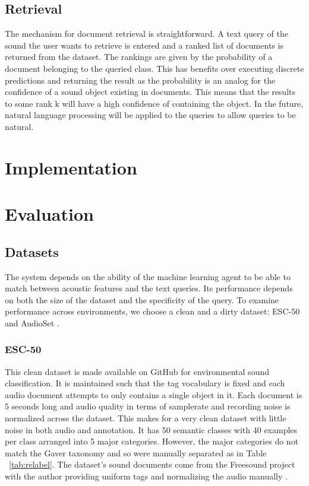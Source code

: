 \subsection{Retrieval}
The mechanism for document retrieval is straightforward. A text query of the sound the user wants to retrieve is entered and a ranked list of documents is returned from the dataset. The rankings are given by the probability of a document belonging to the queried class. This has benefits over executing discrete predictions and returning the result as the probability is an analog for the confidence of a sound object existing in documents. This means that the results to some rank k will have a high confidence of containing the object. In the future, natural language processing will be applied to the queries to allow queries to be natural.

\section{Implementation}

\section{Evaluation}

\subsection{Datasets}
The system depends on the ability of the machine learning agent to be able to match between acoustic features and the text queries. Its performance depends on both the size of the dataset and the specificity of the query. To examine performance across environments, we choose a clean and a dirty dataset: ESC-50 \cite{Piczak2015} and AudioSet \cite{Gemmeke2017}.

\subsubsection{ESC-50}
This clean dataset is made available on GitHub for environmental sound classification. It is maintained such that the tag vocabulary is fixed and each audio document attempts to only contains a single object in it. Each document is 5 seconds long and audio quality in terms of samplerate and recording noise is normalized across the dataset. This makes for a very clean dataset with little noise in both audio and annotation. It has 50 semantic classes with 40 examples per class arranged into 5 major categories. However, the major categories do not match the Gaver taxonomy and so were manually separated as in Table ~\ref{tab:relabel}. The dataset's sound documents come from the Freesound project with the author providing uniform tags and normalizing the audio manually \cite{Font2013}.

